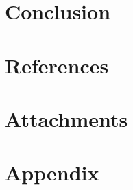 \documentclass{report}
\begin{document}
\chapter{Conclusion}
%

\chapter{References}
%

\chapter{Attachments}
%

\chapter*{Appendix}
%
\end{document}
